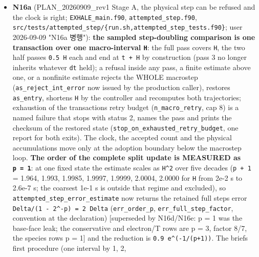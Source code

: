 \documentclass[english,a4paper]{my_memo}
\begin{document}
\begin{itemize}
  section 5 made conditional; new section 3.8 on the physical step never
  being refused for its integration error). \texttt{code\_status\_20260905.md}: the
  Huang et al. 2023 shell-opacity note added to the photoionization row;
  four pre-existing spelling/forbidden-phrase slips fixed on the way
  (\texttt{per-cent} to \texttt{percent} twice, two \texttt{per-molecule} phrases reworded).
  Verification: forbidden-word scans of the four documents; the reproducer\textquotesingle s
  \texttt{run.sh} resolves its default binary path; nothing built or rerun.
\item
  \textbf{N16a} (PLAN\_20260909\_rev1 Stage A, the physical step can be refused
  and the clock is right; \texttt{EXHALE\_main.f90}, \texttt{attempted\_step.f90},
  \texttt{src/tests/attempted\_step/\{run.sh,attempted\_step\_tests.f90\}}; user
  2026-09-09 "N16a 병행"): \textbf{the sampled step-doubling comparison is one
  transaction over one macro-interval \texttt{H}}: the full pass covers \texttt{H}, the
  two half passes \texttt{0.5\ H} each and end at \texttt{t\ +\ H} by construction (pass 3
  no longer inherits whatever \texttt{dt} held); a refusal inside any pass, a
  finite estimate above one, or a nonfinite estimate rejects the WHOLE
  macrostep (\texttt{as\_reject\_int\_error} now issued by the production caller),
  restores \texttt{as\_entry}, shortens \texttt{H} by the controller and recomputes both
  trajectories; exhaustion of the transaction\textquotesingle s retry budget
  (\texttt{n\_macro\_retry}, cap 8) is a named failure that stops with status 2,
  names the pass and prints the checksum of the restored state
  (\texttt{stop\_on\_exhausted\_retry\_budget}, one report for both exits). The clock,
  the accepted count and the physical accumulations move only at the
  adoption boundary below the macrostep loop. \textbf{The order of the complete
  split update is MEASURED as \texttt{p\ =\ 1}}: at one fixed state the estimate
  scales as \texttt{H\^{}2} over five decades (\texttt{p\ +\ 1} = 1.964, 1.993, 1.9985,
  1.9997, 1.9999, 2.0004, 2.0000 for \texttt{H} from 2e-2 s to 2.6e-7 s; the
  coarsest 1e-1 s is outside that regime and excluded), so
  \texttt{attempted\_step\_error\_estimate} now returns the retained full step\textquotesingle s
  error \texttt{Delta/(1\ -\ 2\^{}-p)\ =\ 2\ Delta} (\texttt{err\_order\_p},
  \texttt{err\_full\_step\_factor}, convention at the declaration) {[}superseded by
  N16d/N16e: p = 1 was the base-face leak; the conservative and electron/T
  rows are p = 3, factor 8/7, the species rows p = 1{]} and the reduction
  is \texttt{0.9\ e\^{}(-1/(p+1))}. The brief\textquotesingle s first procedure (one interval by 1, 2,

\end{itemize}
\end{document}
